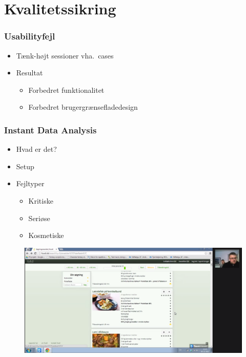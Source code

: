 \section{Kvalitetssikring}

\begin{frame}
	\frametitle{Usabilityfejl}
  \begin{itemize}
<<<<<<< HEAD
    \item Tænk-højt sessioner vha.\ cases
    \item Resultat
    \begin{itemize}
      \item Forbedret funktionalitet
      \item Forbedret brugergrænsefladedesign
    \end{itemize}
  \end{itemize}
\end{frame}

\begin{frame}
	\frametitle{Instant Data Analysis}
  \begin{itemize}
    \item Hvad er det?
	  \item Setup
    \item Fejltyper
      \begin{itemize}
        \item Kritiske
        \item Seriøse
        \item Kosmetiske
      \end{itemize}
  \end{itemize}
\end{frame}

\begin{frame}[fragile]
  \begin{figure}
  \includegraphics[width=\textwidth]{billeder/keldIDA.png}
  \end{figure}
\end{frame}

